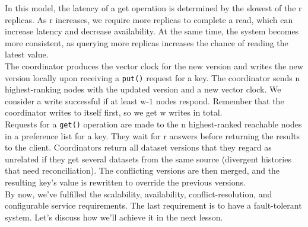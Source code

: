 In this model, the latency of a get operation is determined by the slowest of the \protect{}\label{katex_inline_dAyJOMquFRlXF6l-cBY8m}{{{\(\text{r}\)}}} replicas. As
\protect{}\label{katex_inline_1FSqRfAuGCiY6G8BQh6PU}{{{\(\text{r}\)}}} increases, we require more replicas to complete a read, which can increase latency and decrease availability. At the same time, the system becomes more consistent, as querying more replicas increases the chance of reading the latest value.
\\
The coordinator produces the vector clock for the new version and writes the new version locally upon receiving a \texttt{put()} request for a key. The coordinator sends \protect{}\label{katex_inline_vL2r-loXQOlKsGk64OesW}{{{\(\text{n}\)}}} highest-ranking nodes with the updated version and a new vector clock. We consider a write successful if at least \protect{}\label{katex_inline_xy7_aOAZNHClfOHsZ9yEL}{{{\(\text{w-1}\)}}} nodes respond. Remember that the coordinator writes to itself first, so we get \protect{}\label{katex_inline_f5j5HVJsVRxiMl1h5aGZ0}{{{\(\text{w}\)}}} writes in total.
\\
Requests for a \texttt{get()} operation are made to the \protect{}\label{katex_inline_j7eywECy2zqscVbG8gj0r}{{{\(\text{n}\)}}} highest-ranked reachable nodes in a preference list for a key. They wait for \protect{}\label{katex_inline_OeLWF08aQ_UerUw23JZrr}{{{\(\text{r}\)}}} answers before returning the results to the client. Coordinators return all dataset versions that they regard as unrelated if they get several datasets from the same source (divergent histories that need reconciliation). The conflicting versions are then merged, and the resulting key's value is rewritten to override the previous versions.
\\
By now, we've fulfilled the scalability, availability, conflict-resolution, and configurable service requirements. The last requirement is to have a fault-tolerant system. Let's discuss how we'll achieve it in the next lesson.

